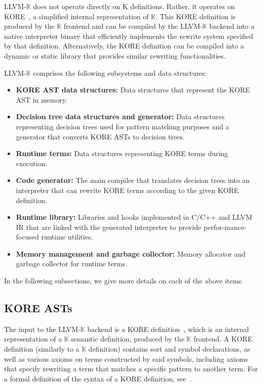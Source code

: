 \documentclass{article}
\theoremstyle{definition}
\newcommand{\K}{$\mathbb{K}$\xspace}
\newcommand{\KL}{LLVM-\K}
\begin{document}
\KL does not operate directly on K definitions. Rather, it operates on KORE~\cite{kore-github}, a simplified internal representation of \K. This KORE definition is produced by the \K frontend and can be compiled by the \KL backend into a native interpreter binary that efficiently implements the rewrite system specified by that definition. Alternatively, the KORE definition can be compiled into a dynamic or static library that provides similar rewriting functionalities. 

\KL comprises the following subsystems and data structures:

\begin{itemize}
    \item \textbf{KORE AST data structures:} Data structures that represent the KORE AST in memory.
    \item \textbf{Decision tree data structures and generator:} Data structures representing decision trees used for pattern matching purposes and a generator that converts KORE ASTs to decision trees.
    \item \textbf{Runtime terms:} Data structures representing KORE terms during execution.
    \item \textbf{Code generator:} The main compiler that translates decision trees into an interpreter that can rewrite KORE terms according to the given KORE definition.
    \item \textbf{Runtime library:} Libraries and hooks implemented in C/C++ and LLVM IR that are linked with the generated interpreter to provide perfor-mance-focused runtime utilities.
    \item \textbf{Memory management and garbage collector:} Memory allocator and garbage collector for runtime terms.
\end{itemize}

In the following subsections, we give more details on each of the above items.


\subsection{KORE ASTs}
The input to the \KL backend is a KORE definition~\cite{kore-github}, which is an internal representation of a \K semantic definition, produced by the \K frontend. A KORE definition (similarly to a \K definition) contains sort and symbol declarations, as well as various axioms on terms constructed by said symbols, including axioms that specify rewriting a term that matches a specific pattern to another term. For a formal definition of the syntax of a KORE definition, see~\cite{kore-syntax}.
\end{document}
